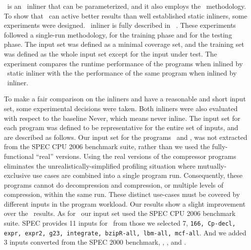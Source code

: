 
\FDI\ is an \FDO\ inliner that can be parameterized, and it also employs the \CP\ methodology. To show that \FDI\ can active better results than well established static inliners, some experiments were designed. \FDI\ inliner is fully described in ~\cite{BerubePhD}. These experiments followed a single-run methodology, for the training phase and for the testing phase. The input set was defined as a minimal coverage set, and the training set was defined as the whole input set except for the input under test. The experiment compares the runtime performance of the programs when inlined by \llvm\ static inliner with the the performance of the same program when inlined by \FDI\ inliner. 

To make a fair comparison on the inliners and have a reasonable and short input set, some experimental decisions were taken. Both inliners were also evaluated with respect to the baseline Never, which means never inline. The input set for each program was defined to be representative for the entire set of inputs, and are described as follows. Our input set for the programs \bzip\ and \gzip, was not extracted from the SPEC CPU 2006 benchmark suite, rather than we used the fully-functional ``real'' versions. Using the real versions of the compressor programs eliminates the unrealistically-simplified profiling situation where mutually-exclusive use cases are combined into a single program run. Consequently, these programs cannot do decompression and compression, or multiple levels of compression, within the same run.  These distinct use-cases must be covered by different inputs in the program workload. Our results show a slight improvement over the \llvm\ results. As for \gcc\ our input set used the SPEC CPU 2006 benchmark suite.  SPEC provides 11 inputs for \gcc\ from those we selected 7, {\tt 166, Cp-decl, expr, expr2, g23, integrate, bzipR-all, lbm-all, mcf-all}. And we added 3 inputs converted from the SPEC 2000 benchmark, \bzip, \lbm, and \mcf.

